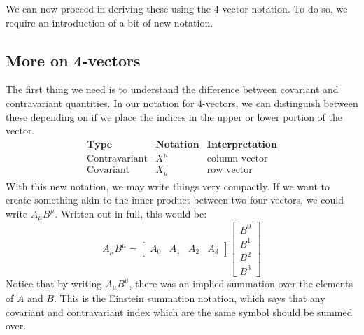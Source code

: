 We can now proceed in deriving these using the 4-vector notation. To do so, we require an introduction of a bit of new notation.

\subsection{More on 4-vectors}
The first thing we need is to understand the difference between covariant and contravariant quantities. In our notation for 4-vectors, we can distinguish between these depending on if we place the indices in the upper or lower portion of the vector. 
\[
\begin{array}{lcc}
\textbf{Type} & \textbf{Notation} & \textbf{Interpretation} \\
\hline
\text{Contravariant} & X^\mu & \text{column vector} \\
\text{Covariant} & X_\mu & \text{row vector}
\end{array}
\]
With this new notation, we may write things very compactly. If we want to create something akin to the inner product between two four vectors, we could write $A_\mu B^\mu$. Written out in full, this would be:
$$A_\mu B^\mu=\begin{bmatrix}
    A_0&A_1&A_2&A_3
\end{bmatrix}\begin{bmatrix}
B^0\\B^1\\B^2\\B^3
\end{bmatrix}$$
Notice that by writing $A_\mu B^\mu$, there was an implied summation over the elements of $A$ and $B$. This is the Einstein summation notation, which says that any covariant and contravariant index which are the same symbol should be summed over. 

